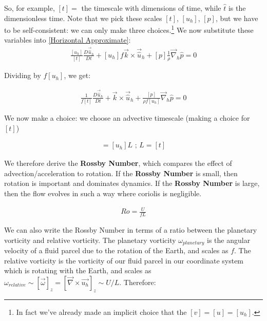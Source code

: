 \noindent So, for example, $[t]= $ the timescale with dimensions of time, while $\hat{t}$ is the dimensionless time. Note that we pick these scales $[t]$, $[u_h]$, $[p]$, but we have to be self-consistent: we can only make three choices.\footnote{
    In fact we've already made an implicit choice that the $[v]=[u]=[u_h]$.  
} We now substitute these variables into \ref{Horizontal Approximate}:
\begin{align*}
    \frac{[u_h]}{[t]}\frac{D\vec{\hat{u}}_h}{Dt}+[u_h]f\vec{k}\times\vec{\hat{u}}_h+[p]\frac{1}{\rho}\vec{\nabla}_h\hat{p}=0
\end{align*}

\noindent Dividing by $f[u_h]$, we get:

\begin{align*}
    \frac{1}{f[t]}\frac{D\vec{\hat{u}}_h}{Dt}+\vec{k}\times\vec{\hat{u}}_h+\frac{[p]}{\rho f [u_h]}\vec{\nabla}_h\hat{p}=0
\end{align*}

\noindent We now make a choice: we choose an advective timescale (making a choice for $[t]$)

\begin{align*}
    [t]=[u_h]L \text{   ;   }
    L=[t]
\end{align*}

We therefore derive the \textbf{Rossby Number}, which compares the effect of advection/acceleration to rotation. If the \textbf{Rossby Number} is small, then rotation is important and dominates dynamics. If the \textbf{Rossby Number} is large, then the flow evolves in such a way where coriolis is negligible.

\begin{align}
    Ro = \frac{U}{fL}
    \label{Rossby Number}
\end{align}

We can also write the Rossby Number in terms of a ratio between the planetary vorticity and relative vorticity. The planetary vorticity $\omega_{planetary}$ is the angular velocity of a fluid parcel due to the rotation of the Earth, and scales as $f$. The relative vorticity is the vorticity of our fluid parcel in our coordinate system which is rotating with the Earth, and scales as $\omega_{relative}\sim[\vec{\omega}]_z=[\vec{\nabla}\times\vec{u_h}]_z\sim U/L$. Therefore:

